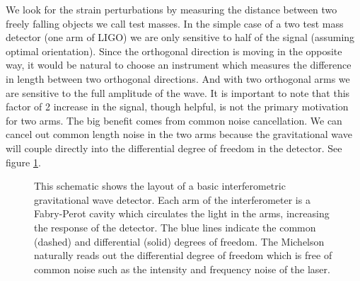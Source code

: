 We look for the strain perturbations by measuring the distance between two
freely falling objects we call test masses.
In the simple case of a two test mass detector (one arm of LIGO) we are only
sensitive to half of the signal (assuming optimal orientation).
Since the orthogonal direction is moving in the opposite way, it would be
natural to choose an instrument which measures the difference in length between
two orthogonal directions.
And with two orthogonal arms we are sensitive to the full
amplitude of the wave.
It is important to note that this factor of 2 increase in the signal, though
helpful, is not the primary motivation for two arms. 
The big benefit comes from common noise cancellation.
We can cancel out common length noise in the two arms because the gravitational
wave will couple directly into the differential degree of freedom in the
detector. See figure \ref{fig:ligoschematic}.

\begin{figure}
\centering
{}
\caption[LIGO Schematic]{This schematic shows the layout of a basic
    interferometric gravitational wave detector.
    Each arm of the interferometer is a Fabry-Perot cavity which circulates
    the light in the arms, increasing the response of the detector.
    The blue lines indicate the common (dashed) and differential (solid)
    degrees of freedom.
    The Michelson naturally reads out the differential degree of freedom which
    is free of common noise such as the intensity and frequency noise of the
    laser.
    }
\label{fig:ligoschematic}
\end{figure}


